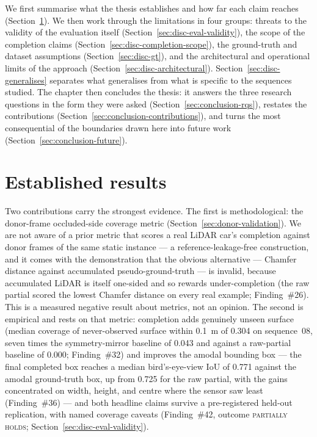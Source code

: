 We first summarise what the thesis establishes and how far each claim reaches
(Section~\ref{sec:disc-what-holds}). We then work through the limitations in four
groups: threats to the validity of the evaluation itself
(Section~\ref{sec:disc-eval-validity}), the scope of the completion claims
(Section~\ref{sec:disc-completion-scope}), the ground-truth and dataset assumptions
(Section~\ref{sec:disc-gt}), and the architectural and operational limits of the
approach (Section~\ref{sec:disc-architectural}). Section~\ref{sec:disc-generalises}
separates what generalises from what is specific to the sequences studied. The
chapter then concludes the thesis: it answers the three research questions in the
form they were asked (Section~\ref{sec:conclusion-rqs}), restates the contributions
(Section~\ref{sec:conclusion-contributions}), and turns the most consequential of the
boundaries drawn here into future work (Section~\ref{sec:conclusion-future}).

\section{Established results}
\label{sec:disc-what-holds}

Two contributions carry the strongest evidence. The first is methodological: the
donor-frame occluded-side coverage metric (Section~\ref{sec:donor-validation}). We are not aware of a prior metric
that scores a real LiDAR car's completion against donor frames of the same static
instance --- a reference-leakage-free construction, and it comes with the demonstration
that the obvious alternative --- Chamfer distance
against accumulated pseudo-ground-truth --- is invalid, because accumulated LiDAR is
itself one-sided and so rewards under-completion (the raw partial scored the lowest
Chamfer distance on every real example; Finding~\#26). This is a measured negative
result about metrics, not an opinion. The second is empirical and rests on that metric:
completion adds genuinely unseen surface (median coverage of never-observed surface
within \SI{0.1}{\metre} of \num{0.304} on sequence~08, seven times the symmetry-mirror
baseline of \num{0.043} and against a raw-partial baseline of \num{0.000};
Finding~\#32) and improves the amodal bounding box --- the final completed box reaches a median
bird's-eye-view IoU of \num{0.771} against the amodal ground-truth box, up from
\num{0.725} for the raw partial, with the gains concentrated on width, height, and
centre where the sensor saw least (Finding~\#36) --- and both headline claims survive a
pre-registered held-out replication, with named coverage caveats
(Finding~\#42, outcome \textsc{partially holds}; Section~\ref{sec:disc-eval-validity}).

